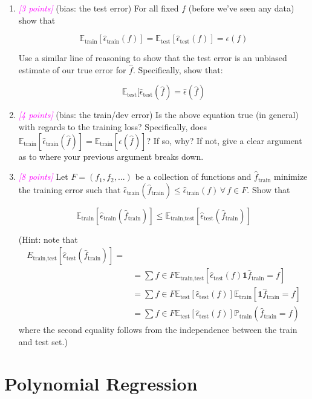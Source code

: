 \documentclass{article}
\newcommand{\1}{\mathbf{1}}
\newcommand{\E}{\mathbb{E}}
\renewcommand{\P}{\mathbb{P}}
\newcommand{\points}[1]{\small\textcolor{magenta}{\emph{[#1 points]}} \normalsize}
\begin{document}
\begin{enumerate}
    \item \points{3} (bias: the test error) For all fixed $f$ (before we’ve seen any data) show that 
    
    $$\E_{\text{train}}[\widehat\epsilon_{\text{train}}(f)] = \E_{\text{test}}[\widehat\epsilon_\text{test}(f)] =\epsilon(f)$$
    
    Use a similar line of reasoning to show that the test error is an unbiased estimate of our true error for $\hat f$. Specifically, show that: 
    
    $$\E_\text{test}[\widehat\epsilon_\text{test}(\hat f) = \widehat\epsilon(\hat f)$$
    
    \item\points{4} (bias: the train/dev error) Is the above equation true (in general) with regards to the training loss? Specifically, does $\E_\text{train}[\widehat\epsilon_\text{train}(\hat f)] = \E_\text{train}[\epsilon(\hat f)]$? If so, why? If not, give a clear argument as to where your previous argument breaks down.
    
    \item\points{8} Let $F = (f_1, f_2,...)$ be a collection of functions and $\hat f_\text{train}$ minimize the training error such that $\widehat\epsilon_\text{train}(\hat f_\text{train}) \leq \widehat\epsilon_\text{train}(f)\,\forall\,f \in F$. Show that 
    
    $$\E_\text{train}[\widehat\epsilon_\text{train}(\hat f_\text{train})] \leq \E_\text{train,test}[\widehat\epsilon_\text{test}(\hat f_\text{train})]$$
    
    (Hint:  note that
    \begin{align*}
        E_\text{train,test}[\widehat\epsilon_\text{test}(\hat f_\text{train})] =& \\
        &= \sum f \in F \E_\text{train,test}[\widehat\epsilon_\text{test}(f)\1{\hat f_\text{train}=f}] \\
        &= \sum f \in F \E_\text{test}[\widehat\epsilon_\text{test}(f)]\E_\text{train}[\1{\hat f_\text{train}=f}] \\ 
        &= \sum f \in F \E_\text{test}[\widehat\epsilon_\text{test}(f)] \P_\text{train}(\hat f_\text{train}=f)
    \end{align*}
    where the second equality follows from the independence between the train and test set.)
\end{enumerate}

\newpage
\section*{Polynomial Regression}
\end{document}

